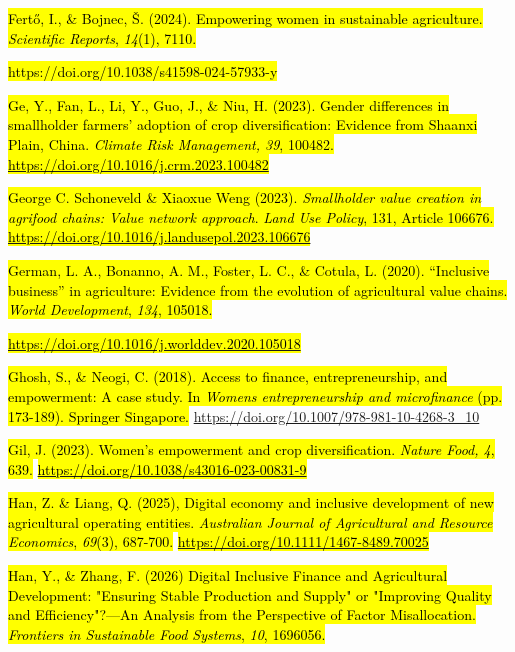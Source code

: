 \documentclass[
]{article}
\begin{document}
\hl{Fertő, I., \& Bojnec, Š. (2024). Empowering women in sustainable
agriculture. \emph{Scientific Reports}, \emph{14}(1), 7110.}

\hl{https://doi.org/10.1038/s41598-024-57933-y}

\hl{Ge, Y., Fan, L., Li, Y., Guo, J., \& Niu, H. (2023). Gender
differences in smallholder farmers' adoption of crop diversification:
Evidence from Shaanxi Plain, China. \emph{Climate Risk Management, 39},
100482.}
\href{https://doi.org/10.1016/j.crm.2023.100482}{\hl{https://doi.org/10.1016/j.crm.2023.100482}}

\hl{George C. Schoneveld \& Xiaoxue Weng (2023). \emph{Smallholder value
creation in agrifood chains: Value network approach}. \emph{Land Use
Policy}, 131, Article 106676.}
\href{https://doi.org/10.1016/j.landusepol.2023.106676}{\hl{https://doi.org/10.1016/j.landusepol.2023.106676}}

\hl{German, L. A., Bonanno, A. M., Foster, L. C., \& Cotula, L. (2020).
``Inclusive business'' in agriculture: Evidence from the evolution of
agricultural value chains. \emph{World Development}, \emph{134},
105018.}

\href{https://doi.org/10.1016/j.worlddev.2020.105018}{\hl{https://doi.org/10.1016/j.worlddev.2020.105018}}

\hl{Ghosh, S., \& Neogi, C. (2018). Access to finance, entrepreneurship,
and empowerment: A case study. In \emph{Women\textquotesingle s
entrepreneurship and microfinance} (pp. 173-189). Springer Singapore.}
\href{https://doi.org/10.1007/978-981-10-4268-3_10}{\hl{}https://doi.org/10.1007/978-981-10-4268-3\_10}

\hl{Gil, J. (2023). Women's empowerment and crop diversification.
\emph{Nature Food, 4}, 639.}
\href{https://doi.org/10.1038/s43016-023-00831-9}{\hl{https://doi.org/10.1038/s43016-023-00831-9}}

\hl{Han, Z. \& Liang, Q. (2025), Digital economy and inclusive
development of new agricultural operating entities. \emph{Australian
Journal of Agricultural and Resource Economics}, \emph{69}(3), 687-700.}
\href{https://doi.org/10.1111/1467-8489.70025}{\hl{https://doi.org/10.1111/1467-8489.70025}}

\hl{Han, Y., \& Zhang, F. (2026) Digital Inclusive Finance and
Agricultural Development: "Ensuring Stable Production and Supply" or
"Improving Quality and Efficiency"?---An Analysis from the Perspective
of Factor Misallocation. \emph{Frontiers in Sustainable Food Systems},
\emph{10}, 1696056.}
\end{document}
